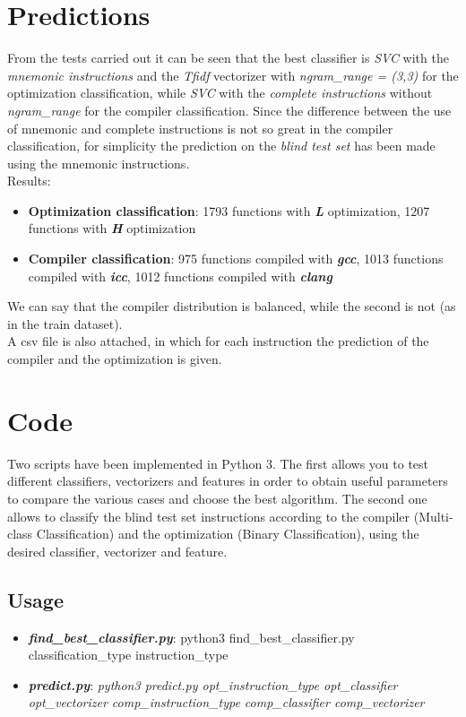 \documentclass[11pt]{article}
\begin{document}
\section{Predictions}
From the tests carried out it can be seen that the best classifier is \textit{SVC} with the \textit{mnemonic instructions} and the \textit{Tfidf} vectorizer with \textit{ngram\_range = (3,3)}  for the optimization classification, while \textit{SVC} with the \textit{complete instructions} without \textit{ngram\_range} for the compiler classification. Since the difference between the use of mnemonic and complete instructions is not so great in the compiler classification, for simplicity the prediction on the \textit{blind test set} has been made using the mnemonic instructions. \\
Results:
\begin{itemize}
	\item \textbf{Optimization classification}: 1793 functions with \textbf{\textit{L}} optimization, 1207 functions with \textbf{\textit{H}} optimization
	\item \textbf{Compiler classification}: 975 functions compiled with \textbf{\textit{gcc}}, 1013 functions compiled with \textbf{\textit{icc}}, 1012 functions compiled with \textbf{\textit{clang}}
\end{itemize}
We can say that the compiler distribution is balanced, while the second is not (as in the train dataset). \\
A csv file is also attached, in which for each instruction the prediction of the compiler and the optimization is given.

\section{Code}
Two scripts have been implemented in Python 3. The first allows you to test different classifiers, vectorizers and features in order to obtain useful parameters to compare the various cases and choose the best algorithm. The second one allows to classify the blind test set instructions according to the compiler (Multi-class Classification) and the optimization (Binary Classification), using the desired classifier, vectorizer and feature.

\subsection{Usage}
\begin{itemize}
	\item \textbf{\textit{find\_best\_classifier.py}}: python3 find\_best\_classifier.py classification\_type instruction\_type
	\item \textbf{\textit{predict.py}}: \textit{python3 predict.py opt\_instruction\_type opt\_classifier opt\_vectorizer comp\_instruction\_type comp\_classifier comp\_vectorizer}
\end{itemize} 
\end{document}
